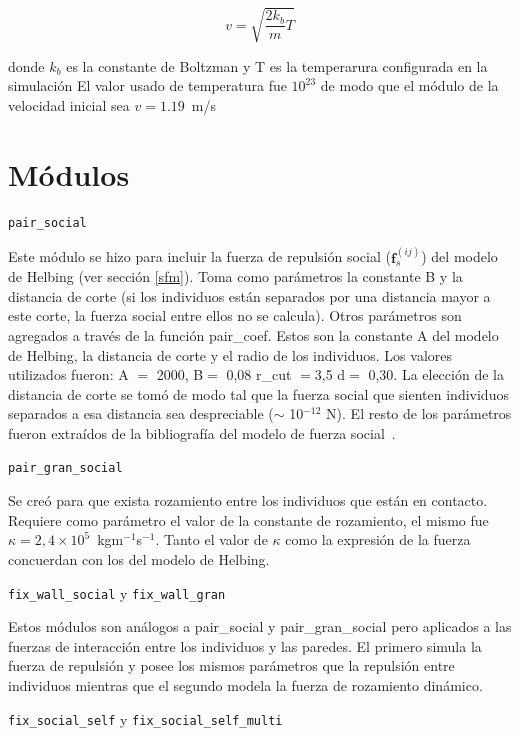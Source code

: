 \begin{equation}
v=\sqrt{\frac{2k_b}{m}T}
\end{equation}

donde $k_b$ es la constante de Boltzman y T es la temperarura configurada en la simulación
El valor usado de temperatura fue $10^{23}$ de modo que el módulo de la velocidad inicial sea $v=1.19$~m/s




\section{\label{modulos}Módulos}

{\Large {\tt pair\_social}}

Este módulo se hizo para incluir la fuerza de repulsión social ($\mathbf{f}_s^{(ij)}$) del modelo de Helbing (ver sección \ref{sfm}). Toma como parámetros la constante B y la distancia de corte (si los individuos están separados por una distancia mayor a este corte, la fuerza social entre ellos no se calcula).
Otros parámetros son agregados a través de la función pair\_coef. Estos son la constante A del modelo de Helbing, la distancia 
de corte y el radio de los individuos. Los valores utilizados fueron: A $=$ 2000, B$=$ 0,08 r\_cut $=$3,5 d$=$ 0,30.
La elección de la distancia de corte se tomó de modo tal que la fuerza social que sienten individuos separados a esa distancia
sea despreciable ($\sim$ 10$^{-12}$ N). El resto de los parámetros fueron extraídos de la bibliografía del modelo de fuerza social~\cite{Helbing1}.

{\Large {\tt pair\_gran\_social}}

Se creó para que exista rozamiento entre los individuos que están en contacto. Requiere como parámetro el valor de la constante de rozamiento, el mismo fue $\kappa =2,4 \times 10^5$~kgm$^{-1}$s$^{-1}$. Tanto el valor de $\kappa$ como la expresión de la fuerza concuerdan con los del modelo de Helbing.

{\Large {\tt fix\_wall\_social} y {\tt fix\_wall\_gran}}

Estos módulos son análogos a pair\_social y pair\_gran\_social pero aplicados a las fuerzas de interacción entre los individuos y las paredes. El primero simula la fuerza de repulsión y posee los mismos parámetros que la repulsión entre individuos mientras que el segundo modela la fuerza de rozamiento dinámico. 

{\Large {\tt fix\_social\_self} y {\tt fix\_social\_self\_multi}}


